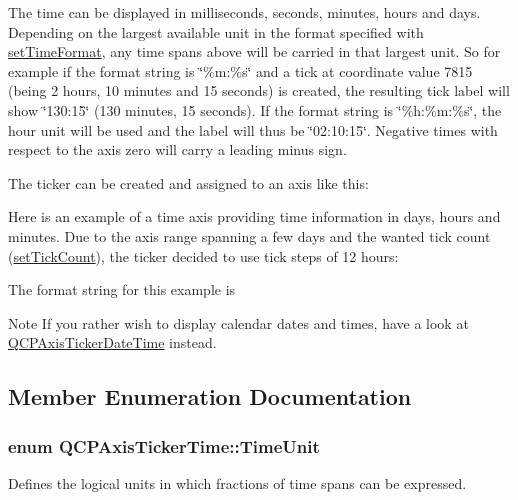 The time can be displayed in milliseconds, seconds, minutes, hours and days. Depending on the largest available unit in the format specified with \hyperlink{classQCPAxisTickerTime_a2f30b6e5125bce4256be9ce3177088ea}{set\+Time\+Format}, any time spans above will be carried in that largest unit. So for example if the format string is \char`\"{}\%m\+:\%s\char`\"{} and a tick at coordinate value 7815 (being 2 hours, 10 minutes and 15 seconds) is created, the resulting tick label will show \char`\"{}130\+:15\char`\"{} (130 minutes, 15 seconds). If the format string is \char`\"{}\%h\+:\%m\+:\%s\char`\"{}, the hour unit will be used and the label will thus be \char`\"{}02\+:10\+:15\char`\"{}. Negative times with respect to the axis zero will carry a leading minus sign.

The ticker can be created and assigned to an axis like this\+: 
\begin{DoxyCodeInclude}
\end{DoxyCodeInclude}
 Here is an example of a time axis providing time information in days, hours and minutes. Due to the axis range spanning a few days and the wanted tick count (\hyperlink{classQCPAxisTicker_a47752abba8293e6dc18491501ae34008}{set\+Tick\+Count}), the ticker decided to use tick steps of 12 hours\+:



The format string for this example is 
\begin{DoxyCodeInclude}
\end{DoxyCodeInclude}
 \begin{DoxyNote}{Note}
If you rather wish to display calendar dates and times, have a look at \hyperlink{classQCPAxisTickerDateTime}{Q\+C\+P\+Axis\+Ticker\+Date\+Time} instead. 
\end{DoxyNote}


\subsection{Member Enumeration Documentation}
\subsubsection[{\texorpdfstring{Time\+Unit}{TimeUnit}}]{\setlength{\rightskip}{0pt plus 5cm}enum {\bf Q\+C\+P\+Axis\+Ticker\+Time\+::\+Time\+Unit}}\hypertarget{classQCPAxisTickerTime_a5c48ded8c6d3a1aca9b68219469fea3e}{}\label{classQCPAxisTickerTime_a5c48ded8c6d3a1aca9b68219469fea3e}
Defines the logical units in which fractions of time spans can be expressed.

